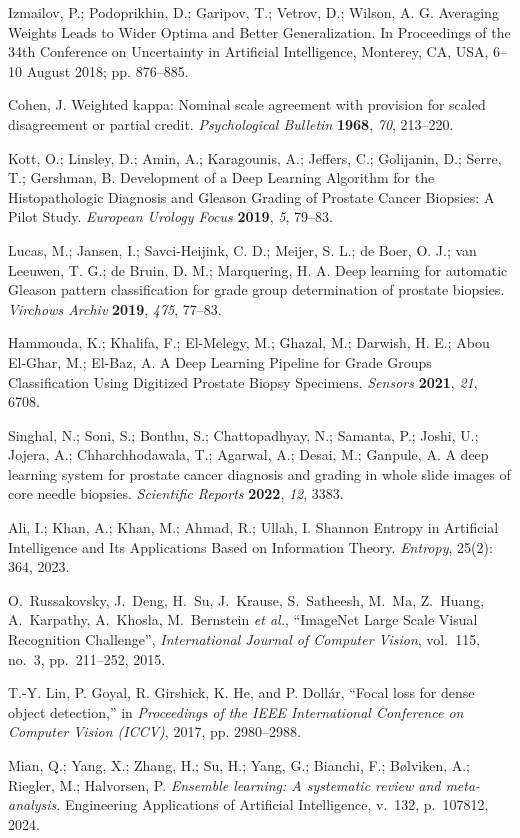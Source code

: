 Izmailov, P.; Podoprikhin, D.; Garipov, T.; Vetrov, D.; Wilson, A. G. Averaging Weights Leads to Wider Optima and Better Generalization. In Proceedings of the 34th Conference on Uncertainty in Artificial Intelligence, Monterey, CA, USA, 6--10 August 2018; pp. 876--885.

Cohen, J. Weighted kappa: Nominal scale agreement with provision for scaled disagreement or partial credit. \textit{Psychological Bulletin} \textbf{1968}, \textit{70}, 213--220.

Kott, O.; Linsley, D.; Amin, A.; Karagounis, A.; Jeffers, C.; Golijanin, D.; Serre, T.; Gershman, B. Development of a Deep Learning Algorithm for the Histopathologic Diagnosis and Gleason Grading of Prostate Cancer Biopsies: A Pilot Study. \textit{European Urology Focus} \textbf{2019}, \textit{5}, 79--83.


Lucas, M.; Jansen, I.; Savci-Heijink, C. D.; Meijer, S. L.; de Boer, O. J.; van Leeuwen, T. G.; de Bruin, D. M.; Marquering, H. A. Deep learning for automatic Gleason pattern classification for grade group determination of prostate biopsies. \textit{Virchows Archiv} \textbf{2019}, \textit{475}, 77--83.

Hammouda, K.; Khalifa, F.; El-Melegy, M.; Ghazal, M.; Darwish, H. E.; Abou El-Ghar, M.; El-Baz, A. A Deep Learning Pipeline for Grade Groups Classification Using Digitized Prostate Biopsy Specimens. \textit{Sensors} \textbf{2021}, \textit{21}, 6708.

Singhal, N.; Soni, S.; Bonthu, S.; Chattopadhyay, N.; Samanta, P.; Joshi, U.; Jojera, A.; Chharchhodawala, T.; Agarwal, A.; Desai, M.; Ganpule, A. A deep learning system for prostate cancer diagnosis and grading in whole slide images of core needle biopsies. \textit{Scientific Reports} \textbf{2022}, \textit{12}, 3383.

Ali, I.; Khan, A.; Khan, M.; Ahmad, R.; Ullah, I.
Shannon Entropy in Artificial Intelligence and Its Applications Based on Information Theory.
\textit{Entropy}, 25(2): 364, 2023.

O.~Russakovsky, J.~Deng, H.~Su, J.~Krause, S.~Satheesh, M.~Ma, Z.~Huang, A.~Karpathy, A.~Khosla, M.~Bernstein \textit{et al.},
``ImageNet Large Scale Visual Recognition Challenge'',
\textit{International Journal of Computer Vision}, 
vol.~115, no.~3, pp.~211--252, 2015.

T.-Y. Lin, P. Goyal, R. Girshick, K. He, and P. Doll\'ar, ``Focal loss for dense object detection,'' in \textit{Proceedings of the IEEE International Conference on Computer Vision (ICCV)}, 2017, pp. 2980--2988.

Mian, Q.; Yang, X.; Zhang, H.; Su, H.; Yang, G.; Bianchi, F.; B{\o}lviken, A.; Riegler, M.; Halvorsen, P.
\textit{Ensemble learning: A systematic review and meta-analysis}.
Engineering Applications of Artificial Intelligence, v.~132, p.~107812, 2024.
